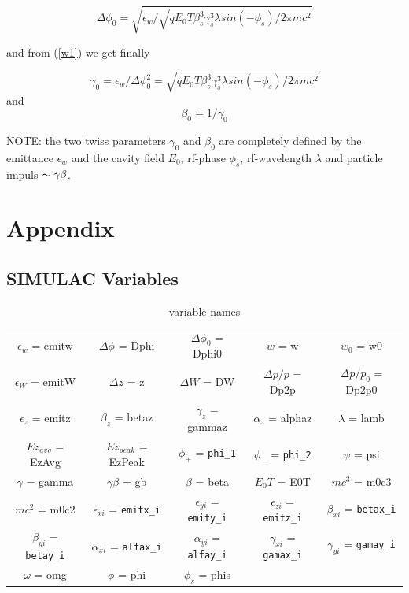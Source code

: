 \documentclass{article}
\begin{document}
\begin{equation}
\Delta\phi_{0} = \sqrt{\epsilon_{w}/\sqrt{qE_{0}T\beta_{s}^{3}\gamma_{s}^{3}\lambda sin(-\phi_{s})/2\pi mc^{2}}} \label{w1}
\end{equation}

and from (\ref{w1}) we get finally

\begin{equation}
\gamma_{0} = \epsilon_{w}/\Delta\phi_{0}^{2} = \sqrt{qE_{0}T\beta_{s}^{3}\gamma_{s}^{3}\lambda sin(-\phi_{s})/2\pi mc^{2}} \label{} \end{equation}
and
\begin{equation}
\beta_{0} = 1/\gamma_{0} \label{}
\end{equation}

NOTE: the two twiss parameters $\gamma_{0}$ and $\beta_{0}$ are completely defined by the emittance $\epsilon_{w}$ and  the cavity field $E_{0}$, rf-phase $\phi_{s}$, rf-wavelength $\lambda$ and particle impuls $\thicksim\gamma\beta$.

\newpage
\section{Appendix}
\subsection{SIMULAC Variables}
\begin{table}[h]
\caption{variable names}
\centering
\begin{tabular}{ c c c c c }
\hline\hline
$\epsilon_{w}$ = emitw    &$\Delta\phi$ = Dphi       &$\Delta\phi_{0}$ = Dphi0    &$w$ = w                &$w_{0}$ = w0 \\
$\epsilon_{W}$ = emitW    &$\Delta z$ = z            &$\Delta W$ = DW             &$\Delta p/p$ = Dp2p    &$\Delta p/p_0$ = Dp2p0 \\
$\epsilon_{z}$ = emitz    &$\beta_{z}$ = betaz       &$\gamma_z$ = gammaz         &$\alpha_z$ = alphaz    &$\lambda$ = lamb \\
$Ez_{avg}$ = EzAvg        &$Ez_{peak}$ = EzPeak      &$\phi_{+}$ = \verb'phi_1'   &$\phi_{-}$ = \verb'phi_2'   &$\psi$ = psi \\
$\gamma$ = gamma          &$\gamma\beta$ = gb        &$\beta$ = beta              &$E_0T$ = E0T           &$mc^3$ = m0c3 \\

$mc^2$ = m0c2       &$\epsilon_{xi}$ = \verb'emitx_i'  &$\epsilon_{yi}$ = \verb'emity_i'  &$\epsilon_{zi}$ = \verb'emitz_i'  &$\beta_{xi}$  = \verb'betax_i' \\
$\beta_{yi}$ = \verb'betay_i' &$\alpha_{xi}$   = \verb'alfax_i'  &$\alpha_{yi}$   = \verb'alfay_i'  &$\gamma_{xi}$   = \verb'gamax_i'  &$\gamma_{yi}$ = \verb'gamay_i'  \\
$\omega$ = omg           &$\phi$ = phi               &$\phi_{s}$ = phis 
\end{tabular}
\end{table}
\end{document}
